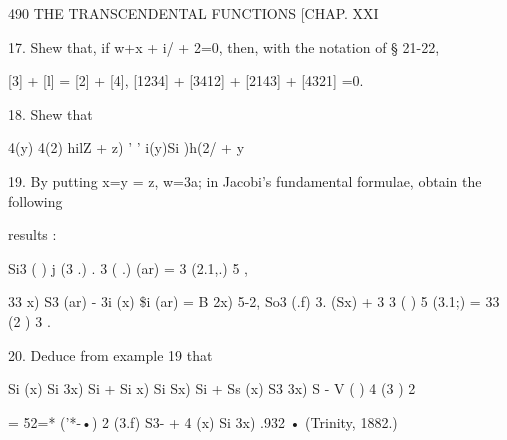 490 THE TRANSCENDENTAL FUNCTIONS [CHAP. XXI

17. Shew that, if w+x + i/ + 2=0, then, with the notation of § 21-22,

[3] + [l] = [2] + [4], [1234] + [3412] + [2143] + [4321] =0.

18. Shew that

 4(y) 4(2) hilZ + z) ' ' i(y)Si )h(2/ + y

19. By putting x=y = z, w=3a; in Jacobi's fundamental formulae, obtain
the following

results :

Si3 ( ) j (3 .) . 3 ( .) (ar) = 3 (2.1,.) 5 ,

 33 x) S3 (ar) - 3i (x) \$i (ar) = B 2x) 5-2, So3 (.f) 3. (Sx) + 3 3 (
) 5 (3.1;) = 33 (2 ) 3 .

20. Deduce from example 19 that

 Si (x) Si 3x) Si + Si x) Si Sx) Si + Ss (x) S3 3x) S - V ( ) 4 (3 ) 2

= 52=* ('*-•) 2 (3.f) S3- + 4 (x) Si 3x) .932 • (Trinity, 1882.)


